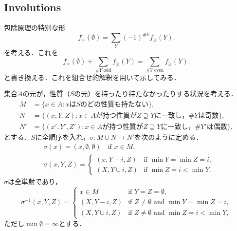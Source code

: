 \documentclass[xelatex,ja=standard,a4paper,14pt,everyparhook=compat]{bxjsarticle}
\theoremstyle{definition}
\begin{document}
\setcounter{section}{2}
\setcounter{subsection}{5}
\subsection{Involutions}

包除原理の特別な形 \begin{equation*}
    f_=(\emptyset) = \sum_Y (-1)^{\#Y} f_\geq(Y).
\end{equation*}
を考える．これを \begin{equation*}
    f_=(\emptyset) + \sum_{\#Y\text{ odd}} f_\geq(Y) = \sum_{\#Y\text{ even}} f_\geq(Y).
\end{equation*}
と書き換える．これを組合せ的解釈を用いて示してみる．

集合$A$の元が，性質（$S$の元）を持ったり持たなかったりする状況を考える． \begin{align*}
    M  & = \{x \in A: \text{$x$は$S$のどの性質も持たない}\},                                   \\
    N  & = \{(x, Y, Z): \text{$x \in A$が持つ性質が$Z \supseteq Y$に一致し，$\#Y$は奇数}\},    \\
    N' & = \{(x', Y', Z'): \text{$x \in A$が持つ性質が$Z \supseteq Y$に一致し，$\#Y'$は偶数}\},
\end{align*}
とする．$S$に全順序を入れ，$\sigma: M \cup N \to N'$を次のように定める． \begin{align*}
     & \sigma(x) = (x, \emptyset, \emptyset) \quad \text{if $x \in M$}, \\
     & \sigma(x, Y, Z) = \begin{cases}
        (x, Y - i, Z)    & \text{if $\min Y = \min Z = i$}, \\
        (X, Y \cup i, Z) & \text{if $\min Z = i < \min Y$}.
    \end{cases}
\end{align*}
$\sigma$は全単射であり， \begin{equation*}
    \sigma^{-1}(x, Y, Z) = \begin{cases}
        x \in M          & \text{if $Y = Z = \emptyset$},                          \\
        (X, Y-i, Z)      & \text{if $Z \neq \emptyset$ and $\min Y = \min Z = i$}, \\
        (X, Y \cup i, Z) & \text{if $Z \neq \emptyset$ and $\min Z = i < \min Y$},
    \end{cases}
\end{equation*}
ただし$\min \emptyset = \infty$とする．
\end{document}
